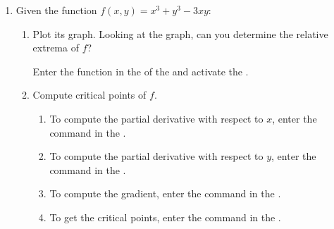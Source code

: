 \begin{enumerate}[leftmargin=*]
\item Given the function $f(x,y)=x^3+y^3-3xy$:
      \begin{enumerate}
      \item Plot its graph.
            Looking at the graph, can you determine the relative extrema of $f$?
            \begin{indication}
            Enter the function  in the  of the  and activate the .
            \end{indication}

      \item Compute critical points of $f$.
            \begin{indication}
            \begin{enumerate}
            \item To compute the partial derivative with respect to $x$, enter the command  in the .
            \item To compute the partial derivative with respect to $y$, enter the command  in the .
            \item To compute the gradient, enter the command  in the .
            \item To get the critical points, enter the command  in the .
            \end{enumerate}
            \end{indication}


\end{enumerate}
\end{enumerate}
